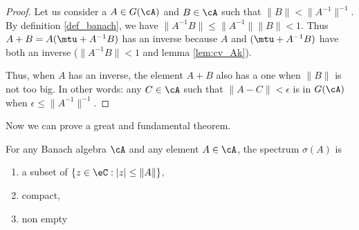 \begin{proof}
	Let us consider a $A\in G(\cA)$ and $B\in\cA$ such that $\|B\|<\|A^{-1}\|^{-1}$. By definition \ref{def_banach}, we have $\|A^{-1} B\|\leq\|A^{-1}\|\|B\|<1$. Thus $A+B=A(\mtu+A^{-1} B)$ has an inverse because $A$ and $(\mtu+A^{-1} B)$ have both an inverse ($\|A^{-1} B\|<1$ and lemma \ref{lem:cv_Ak}).

	Thus, when $A$ has an inverse, the element $A+B$ also has a one when $\|B\|$ is not too big. In other words: any $C\in\cA$ such that $\|A-C\|<\epsilon$ is in $G(\cA)$ when $\epsilon\leq\|A^{-1}\|^{-1}$.
\end{proof}

Now we can prove a great and fundamental theorem.

\begin{theorem}			\label{ThoSpecBanach}
    For any Banach algebra $\cA$ and any element $A\in\cA$, the spectrum $\sigma(A)$ is
    \begin{enumerate}
        \item       \label{ItemThoSpecBanachi}
            a subset of $\{z\in\eC:|z|\leq\|A\|\}$,
        \item
            compact,
        \item
            non empty
        \end{enumerate}
\end{theorem} \label{tho:prop_sigma}


